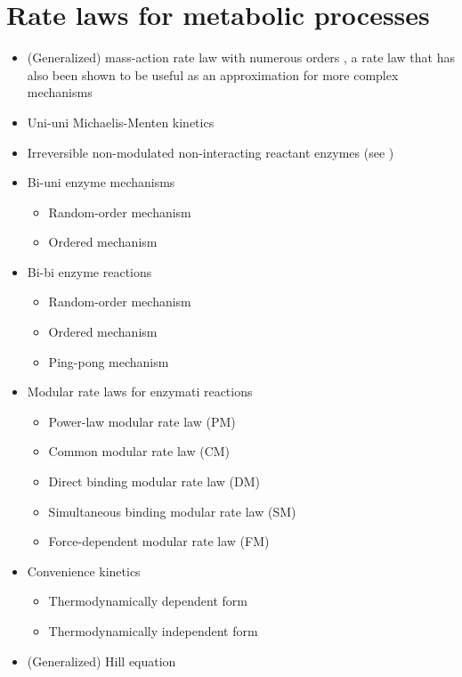 \section{Rate laws for metabolic processes}
\begin{itemize}
  \item (Generalized) mass-action rate law with numerous orders \citep[p.~16]{Guldberg1879, Heinrich1996},
        a rate law that has also been shown to be useful as an approximation for more complex mechanisms
        \citep{Draeger2007a, Draeger2009a}
  \item Uni-uni Michaelis-Menten kinetics \citep{Michaelis1913}
  \item Irreversible non-modulated non-interacting reactant enzymes (see \SBO)
  \item Bi-uni enzyme mechanisms \citep{Segel1993, Bisswanger2000, Cornish-Bowden2004}
  \begin{itemize}
    \item Random-order mechanism
    \item Ordered mechanism
  \end{itemize}
  \item Bi-bi enzyme reactions \citep{Segel1993, Bisswanger2000, Cornish-Bowden2004}
  \begin{itemize}
    \item Random-order mechanism \citep[p.~169]{Cornish-Bowden2004}
    \item Ordered mechanism
    \item Ping-pong mechanism
  \end{itemize}
  \item Modular rate laws for enzymati reactions \citep{Liebermeister2010}
  \begin{itemize}
    \item Power-law modular rate law (PM)
    \item Common modular rate law (CM)
    \item Direct binding modular rate law (DM)
    \item Simultaneous binding modular rate law (SM)
    \item Force-dependent modular rate law (FM)
  \end{itemize}
  \item Convenience kinetics \citep{Liebermeister2006}
  \begin{itemize}
    \item Thermodynamically dependent form
    \item Thermodynamically independent form
  \end{itemize}
  \item (Generalized) Hill equation \citep[p.~314]{Hill1910, Cornish-Bowden2004}
\end{itemize}

